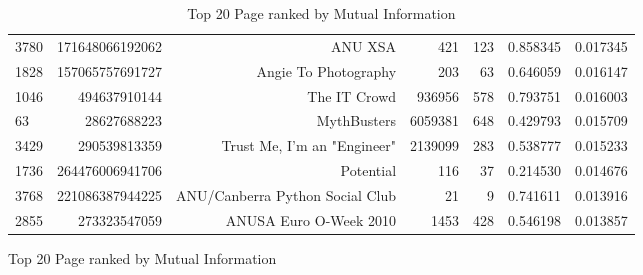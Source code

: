 \documentclass[letterpaper]{article}
\begin{document}
\begin{figure}
\begin{table}
\begin{tabular}{| >{\small}l | >{\small}r | >{\small}r | >{\small}r | >{\small}r | >{\small}r |>{\small}r |}
3780 &  171648066192062 &                                            ANU XSA &       421 &      123 &             0.858345 &            0.017345 \\
1828 &  157065757691727 &                               Angie To Photography &       203 &       63 &             0.646059 &            0.016147 \\
1046 &     494637910144 &                                       The IT Crowd &    936956 &      578 &             0.793751 &            0.016003 \\
63   &      28627688223 &                                        MythBusters &   6059381 &      648 &             0.429793 &            0.015709 \\
3429 &     290539813359 &                        Trust Me, I'm an "Engineer" &   2139099 &      283 &             0.538777 &            0.015233 \\
1736 &  264476006941706 &                                          Potential &       116 &       37 &             0.214530 &            0.014676 \\
3768 &  221086387944225 &                    ANU/Canberra Python Social Club &        21 &        9 &             0.741611 &            0.013916 \\
2855 &     273323547059 &                             ANUSA Euro O-Week 2010 &      1453 &      428 &             0.546198 &            0.013857 \\
\hline
\end{tabular}
\caption{Top 20 Page ranked by Mutual Information}
\label {Top 20 Page ranked by Mutual Information}
\end{table}

\cleardoublepage


\end{figure}
\end{document}

